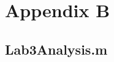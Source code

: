 \chapter{Appendix B}
\label{cp:code}
\section{Lab3Analysis.m}

\inputminted{matlab}{Code/Lab3Analysis.m}\label{listing:data_analysis_script}